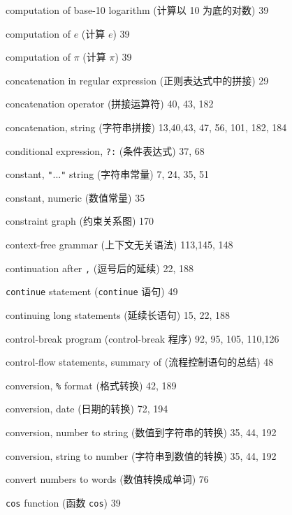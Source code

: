 \begin{multicols}{2}
\hangindent=2pc  computation of base-10 logarithm (计算以 10
为底的对数) 39

\hangindent=2pc  computation of $e$ (计算 $e$) 39

\hangindent=2pc  computation of $\pi$ (计算 $\pi$) 39

\hangindent=2pc  concatenation in regular expression
(正则表达式中的拼接) 29

\hangindent=2pc  concatenation operator (拼接运算符) 40, 43, 182

\hangindent=2pc  concatenation, string (字符串拼接) 13,40,43, 47, 56, 101, 182, 184

\hangindent=2pc  conditional expression, \verb'?:' (条件表达式) 37, 68

\hangindent=2pc  constant, \verb'"'...\verb'"' string
(字符串常量) 7, 24, 35, 51

\hangindent=2pc  constant, numeric (数值常量) 35

\hangindent=2pc  constraint graph (约束关系图) 170

\hangindent=2pc  context-free grammar (上下文无关语法) 113,145, 148

\hangindent=2pc  continuation after \verb',' (逗号后的延续) 22, 188

\hangindent=2pc  \verb'continue' statement (\verb'continue'
语句) 49

\hangindent=2pc  continuing long statements (延续长语句) 15, 22, 188

\hangindent=2pc  control-break program (control-break 程序) 92, 95, 105, 110,126

\hangindent=2pc  control-flow statements, summary of
(流程控制语句的总结) 48

\hangindent=2pc  conversion, \verb'%' format (格式转换) 42, 189

\hangindent=2pc  conversion, date (日期的转换) 72, 194

\hangindent=2pc  conversion, number to string
(数值到字符串的转换) 35, 44, 192

\hangindent=2pc  conversion, string to number
(字符串到数值的转换) 35, 44, 192

\hangindent=2pc  convert numbers to words (数值转换成单词) 76

\hangindent=2pc  \verb'cos' function (函数 \verb'cos') 39


\end{multicols}

